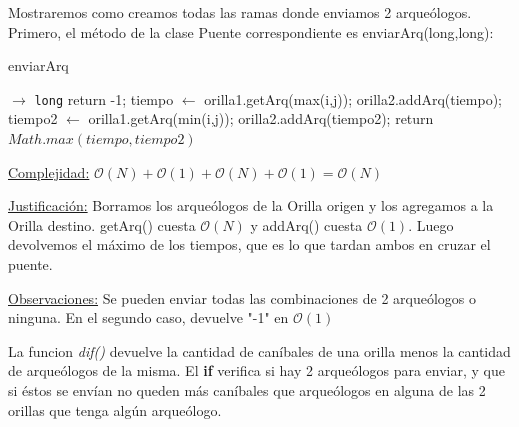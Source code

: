 Mostraremos como creamos todas las ramas donde enviamos 2 arqueólogos. Primero, el m\'etodo de la clase Puente correspondiente es enviarArq(long,long):

\begin{algorithm}[H]
\caption{enviarArq}
\begin{algorithmic}[1]
     $\to $ \texttt{long}
            \State	return -1;
        \EndIf
		\State tiempo $\leftarrow$ orilla1.getArq(max(i,j));
		\State orilla2.addArq(tiempo);
		\State tiempo2 $\leftarrow$ orilla1.getArq(min(i,j));
		\State orilla2.addArq(tiempo2);
	    \State \State return $Math.max(tiempo, tiempo2)$
    \EndProcedure
\end{algorithmic}
\underline{Complejidad:} 
$\mathcal{O}(N) + \mathcal{O}(1) + \mathcal{O}(N) + \mathcal{O}(1) = \mathcal{O}(N)$

\vspace*{5mm}
\underline{Justificación:} Borramos los arque\'ologos de la Orilla origen y los agregamos a la Orilla destino. getArq() cuesta $\mathcal{O}(N)$ y addArq() cuesta $\mathcal{O}(1)$. Luego devolvemos el m\'aximo de los tiempos, que es lo que tardan ambos en cruzar el puente.


\underline{Observaciones:} Se pueden enviar todas las combinaciones de 2 arque\'ologos o ninguna. En el segundo caso, devuelve "-1" en $\mathcal{O}(1)$
\end{algorithm}

La funcion \textit{dif()} devuelve la cantidad de can\'ibales de una orilla menos la cantidad de arque\'ologos de la misma. El \textbf{if} verifica si hay 2 arque\'ologos para enviar, y que si \'estos se env\'ian no queden m\'as can\'ibales que arque\'ologos en alguna de las 2 orillas que tenga alg\'un arque\'ologo.

